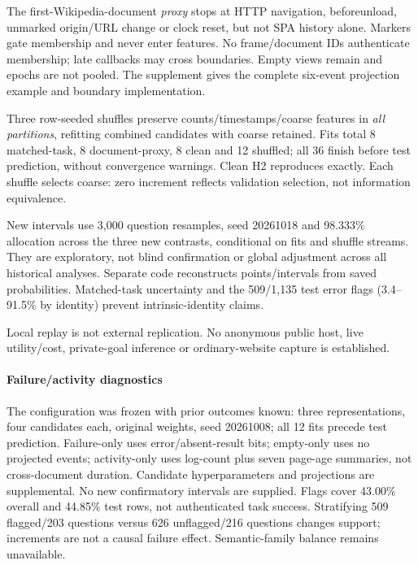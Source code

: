 

The first-Wikipedia-document \emph{proxy} stops at HTTP navigation, beforeunload, unmarked origin/URL change or clock reset, but not SPA history alone. Markers gate membership and never enter features. No frame/document IDs authenticate membership; late callbacks may cross boundaries. Empty views remain and epochs are not pooled. The supplement gives the complete six-event projection example and boundary implementation.

Three row-seeded shuffles preserve counts/timestamps/coarse features in \emph{all partitions}, refitting combined candidates with coarse retained. Fits total 8 matched-task, 8 document-proxy, 8 clean and 12 shuffled; all 36 finish before test prediction, without convergence warnings. Clean H2 reproduces exactly. Each shuffle selects coarse: zero increment reflects validation selection, not information equivalence.



New intervals use 3,000 question resamples, seed 20261018 and 98.333\% allocation across the three new contrasts, conditional on fits and shuffle streams. They are exploratory, not blind confirmation or global adjustment across all historical analyses. Separate code reconstructs points/intervals from saved probabilities. Matched-task uncertainty and the 509/1,135 test error flags (3.4--91.5\% by identity) prevent intrinsic-identity claims.

Local replay is not external replication. No anonymous public host, live utility/cost, private-goal inference or ordinary-website capture is established.

\paragraph{Failure/activity diagnostics}
The configuration was frozen with prior outcomes known: three representations, four candidates each, original weights, seed 20261008; all 12 fits precede test prediction. Failure-only uses error/absent-result bits; empty-only uses no projected events; activity-only uses log-count plus seven page-age summaries, not cross-document duration. Candidate hyperparameters and projections are supplemental. No new confirmatory intervals are supplied. Flags cover 43.00\% overall and 44.85\% test rows, not authenticated task success. Stratifying 509 flagged/203 questions versus 626 unflagged/216 questions changes support; increments are not a causal failure effect. Semantic-family balance remains unavailable.

